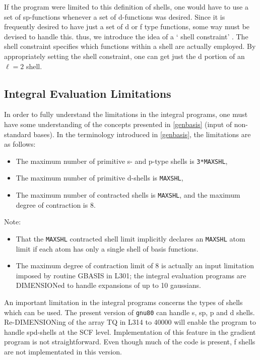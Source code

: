If the program were limited to this definition of shells, one would
have to use a set of sp-functions whenever a set of d-functions was
desired. Since it is frequently desired to have just a set of d or f
type functions, some way must be devised to handle this.
thus, we introduce the idea of a ` shell constraint' .  The shell
constraint specifies which functions within a shell are actually
employed. By appropriately setting the shell constraint, one can get
just the d portion of an $\ell =2$ shell.
\subsection{\sf Integral Evaluation Limitations}
In order to fully understand the limitations in the 
integral programs, one
must have some understanding of the concepts presented in \ref{genbasis}
(input of non-standard bases).  In the terminology introduced in
\ref{genbasis}, the limitations are as follows: 
\begin{itemize}
\item The maximum number of
primitive s- and p-type shells is {\tt 3*MAXSHL},
\item The maximum number of primitive
d-shells is {\tt MAXSHL}, 
\item The maximum number of contracted shells is {\tt MAXSHL}, and the
maximum degree of contraction is 8.  
\end{itemize}
Note:
\begin{itemize}
\item That the {\tt MAXSHL} contracted shell
limit implicitly declares an {\tt MAXSHL} atom limit if each atom has only a single
shell of basis functions.  
\item The maximum degree of contraction limit of
8 is actually an input limitation imposed by routine GBASIS in L301;
the integral evaluation programs are DIMENSIONed to handle expansions of
up to 10 gaussians.
\end{itemize}
An important limitation in the integral programs concerns the types of shells
which can be used.  The present version of  {\tt gnu80} can handle s,
sp, p and d shells.  Re-DIMENSIONing of the array TQ in L314 to 40000
will enable the program to handle spd-shells at the SCF level.  Implementation
of this feature in the gradient program is not straightforward.  Even though
much  of the code is present, f shells are not implementated in this version.

